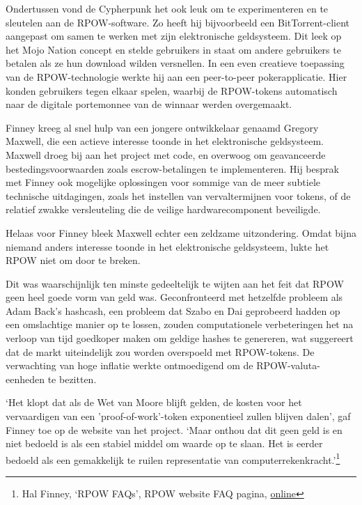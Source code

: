 \documentclass[smalldemyvopaper,11pt,twoside,onecolumn,openright,extrafontsizes,hidelinks]{memoir}
\begin{document}
Ondertussen vond de Cypherpunk het ook leuk om te experimenteren en te
sleutelen aan de RPOW-software. Zo heeft hij bijvoorbeeld een
BitTorrent-client aangepast om samen te werken met zijn elektronische
geldsysteem. Dit leek op het Mojo Nation concept en stelde gebruikers in
staat om andere gebruikers te betalen als ze hun download wilden
versnellen. In een even creatieve toepassing van de RPOW-technologie
werkte hij aan een peer-to-peer pokerapplicatie. Hier konden gebruikers
tegen elkaar spelen, waarbij de RPOW-tokens automatisch naar de digitale
portemonnee van de winnaar werden overgemaakt.

Finney kreeg al snel hulp van een jongere ontwikkelaar genaamd Gregory
Maxwell, die een actieve interesse toonde in het elektronische
geldsysteem. Maxwell droeg bij aan het project met code, en overwoog om
geavanceerde bestedingsvoorwaarden zoals escrow-betalingen te
implementeren. Hij besprak met Finney ook mogelijke oplossingen voor
sommige van de meer subtiele technische uitdagingen, zoals het instellen
van vervaltermijnen voor tokens, of de relatief zwakke versleuteling die
de veilige hardwarecomponent beveiligde.

Helaas voor Finney bleek Maxwell echter een zeldzame uitzondering. Omdat
bijna niemand anders interesse toonde in het elektronische geldsysteem,
lukte het RPOW niet om door te breken.

Dit was waarschijnlijk ten minste gedeeltelijk te wijten aan het feit
dat RPOW geen heel goede vorm van geld was. Geconfronteerd met hetzelfde
probleem als Adam Back's hashcash, een probleem dat Szabo en Dai
geprobeerd hadden op een omslachtige manier op te lossen, zouden
computationele verbeteringen het na verloop van tijd goedkoper maken om
geldige hashes te genereren, wat suggereert dat de markt uiteindelijk
zou worden overspoeld met RPOW-tokens. De verwachting van hoge inflatie
werkte ontmoedigend om de RPOW-valuta-eenheden te bezitten.

`Het klopt dat als de Wet van Moore blijft gelden, de kosten voor het
vervaardigen van een 'proof-of-work'-token exponentieel zullen blijven
dalen', gaf Finney toe op de website van het project. `Maar onthou dat
dit geen geld is en niet bedoeld is als een stabiel middel om waarde op
te slaan. Het is eerder bedoeld als een gemakkelijk te ruilen
representatie van computerrekenkracht.'\footnote{Hal Finney, `RPOW
  FAQs', RPOW website FAQ pagina,
  \href{https://web.archive.org/web/20090217090439/http://rpow.net/faqs.html\#inflation}{online}}
\end{document}
